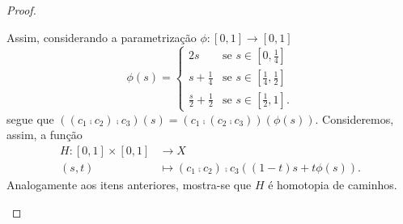 \begin{proof}
\begin{enumerate}
	Assim, considerando a parametrização $\phi: [0,1] \to [0,1]$
	\begin{equation*}
	\phi(s)
		=
			\begin{cases}
				2s &\text{se $s \in [0,\frac{1}{4}]$} \\
				s + \frac{1}{4} &\text{se $s \in [\frac{1}{4},\frac{1}{2}]$} \\
				\frac{s}{2}+\frac{1}{2} &\text{se $s \in [\frac{1}{2},1]$}.
			\end{cases}
	\end{equation*}	
segue que $((c_1 \comp c_2) \comp c_3)(s) = (c_1 \comp (c_2 \comp c_3)) (\phi(s))$. Consideremos, assim, a função
	\begin{align*}
	H: [0,1] \times [0,1] &\to X \\
		(s,t) &\mapsto (c_1 \comp c_2) \comp c_3 ((1-t)s + t \phi(s)).
	\end{align*}
	Analogamente aos itens anteriores, mostra-se que $H$ é homotopia de caminhos.
	\end{enumerate}
\end{proof}


